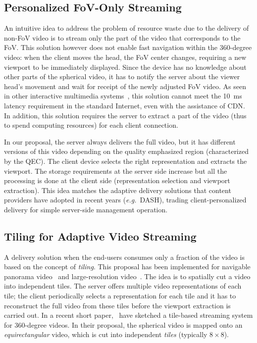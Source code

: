 \subsection{Personalized FoV-Only Streaming}

An intuitive idea to address the problem of resource waste due to the
delivery of non-FoV video is to stream only the part of the video that
corresponds to the \ac{FoV}. This solution however does not enable
fast navigation within the 360-degree video: when the client moves the
head, the FoV center changes, requiring a new viewport to be
immediately displayed. Since the device has no knowledge about other
parts of the spherical video, it has to notify the server about the
viewer head's movement and wait for receipt of the newly adjusted FoV
video. As seen in other interactive multimedia
systems~\cite{ChoyWSR14}, this solution cannot meet the \SI{10}{ms} latency
requirement in the standard Internet, even with the assistance of
\ac{CDN}. In addition, this solution requires the server to extract a
part of the video (thus to spend computing resources) for each client
connection.

 In our proposal, the server always delivers
the full video, but it has different versions of this video depending
on the quality emphasized region (characterized by the QEC). The client device
selects the right representation and extracts the viewport. The
storage requirements at the server side increase but all the
processing is done at the client side (representation selection and
viewport extraction). This idea matches the adaptive delivery
solutions that content providers have adopted in recent years
(\textit{e.g.}~\ac{DASH}), trading client-personalized delivery for
simple server-side management operation.

\subsection{Tiling for Adaptive Video Streaming}

A delivery solution when the end-users consumes only a fraction of the
video is based on the concept of \emph{tiling}. This proposal has been
implemented for navigable panorama
video~\cite{sanchez_compressed_2015,wang_mixing_2014,gaddam_tiling_2015}
and large-resolution video~\cite{jean16mmsys}. The idea is to
spatially cut a video into independent tiles. The server offers
multiple video representations of each tile; the client periodically
selects a representation for each tile and it has to reconstruct the
full video from these tiles before the viewport extraction is carried
out. In a recent short paper,~\citet{ochi_live_2015} have sketched a
tile-based streaming system for 360-degree videos. In their proposal,
the spherical video is mapped onto an \emph{equirectangular} video,
which is cut into independent \emph{tiles} (typically $8\times 8$).

